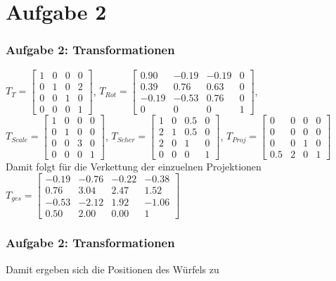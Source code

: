 \documentclass[accentcolor=tud9c,colorbacktitle,inverttitle,landscape,german,presentation,t]{tudbeamer}
\begin{document}
\section{Aufgabe 2}
\begin{frame}
	\frametitle{Aufgabe 2: Transformationen}
	$T_T=\begin{bmatrix}
	1 & 0 & 0 & 0\\
	0 & 1 & 0 & 2\\
	0 & 0 & 1 & 0\\
	0 & 0 & 0 & 1
	\end{bmatrix} $, 
	$T_{Rot}=\begin{bmatrix}
	0.90 & -0.19 & -0.19 & 0\\
	0.39 & 0.76 & 0.63 & 0\\
	-0.19 & -0.53 & 0.76 & 0\\
	0 & 0 & 0 & 1
	\end{bmatrix} $, 
	$T_{Scale}=\begin{bmatrix}
	1 & 0 & 0 & 0\\
	0 & 1 & 0 & 0\\
	0 & 0 & 3 & 0\\
	0 & 0 & 0 & 1
	\end{bmatrix} $, 
	$T_{Scher}=\begin{bmatrix}
	1 & 0 & 0.5 & 0\\
	2 & 1 & 0.5 & 0\\
	2 & 0 & 1 & 0\\
	0 & 0 & 0 & 1
	\end{bmatrix} $,
	 $T_{Proj}=\begin{bmatrix}
	 0 & 0 & 0 & 0\\
	 0 & 0 & 0 & 0\\
	 0 & 0 & 1 & 0\\
	 0.5 & 2 & 0 & 1
	 \end{bmatrix} $\\
	 
	 Damit folgt für die Verkettung der einzuelnen Projektionen\\
	 $T_{ges}=\begin{bmatrix}
	 -0.19 & -0.76 & -0.22 & -0.38\\
	  0.76 &  3.04 &  2.47 &  1.52\\
	 -0.53 & -2.12 &  1.92 & -1.06\\
	  0.50 &  2.00 &  0.00 &  1
	 \end{bmatrix} $
\end{frame}
\begin{frame}
	\frametitle{Aufgabe 2: Transformationen}
	Damit ergeben sich die Positionen des Würfels zu
	
\end{frame}
\end{document}
